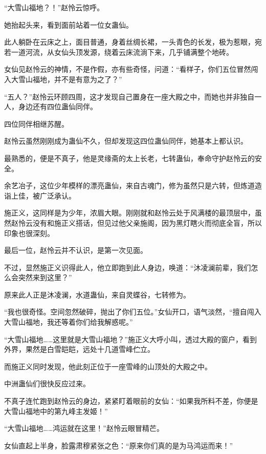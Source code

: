 
\begin{this_body}



“大雪山福地？！”赵怜云惊呼。

她抬起头来，看到面前站着一位女蛊仙。

此人躺卧在云床之上，面目普通，身着丝绸长裙，一头青色的长发，极为惹眼，宛若一道河流，从女仙头顶发源，绕着云床流淌下来，几乎铺满整个地砖。

女仙见赵怜云的神情，不是作假，亦有些奇怪，问道：“看样子，你们五位冒然闯入大雪山福地，并不是有意为之了？”

“五人？”赵怜云环顾四周，这才发现自己置身在一座大殿之中，而她也并非独自一人，身边还有四位蛊仙同伴。

四位同伴相继苏醒。

赵怜云虽然刚刚成为蛊仙不久，但却发现这四位蛊仙同伴，她基本上都认识。

最熟悉的，便是不真子，他是灵缘斋的太上长老，七转蛊仙，奉命守护赵怜云的安全。

余艺冶子，这位少年模样的漂亮蛊仙，来自古魂门，修为虽然只是六转，但炼道造诣上佳，被广泛承认。

施正义，这同样是为少年，浓眉大眼。刚刚就和赵怜云处于风满楼的最顶层中，虽然赵怜云没有和施正义搭话，但见过他父亲施阁，因为黑灯瞎火而彻底全盲，所以印象也很深刻。

最后一位，赵怜云并不认识，是第一次见面。

不过，显然施正义识得此人，他立即跑到此人身边，唤道：“沐凌澜前辈，我们怎么会突然来到这里？”

原来此人正是沐凌澜，水道蛊仙，来自灵蝶谷，七转修为。

“我也很奇怪。空间忽然破碎，抛出了你们五位。”女仙开口，语气淡然，“擅自闯入大雪山福地，我还等着你们给我解惑呢。”

“大雪山福地……这里就是大雪山福地？”施正义大呼小叫，透过大殿的窗户，看到外界，果然是白雪皑皑，远处十几道雪峰伫立。

而施正义同时发现，他此刻正位于一座雪峰的山顶处的大殿之中。

中洲蛊仙们很快反应过来。

不真子连忙跑到赵怜云的身边，紧紧盯着眼前的女仙：“如果我所料不差，你便是大雪山福地中的第九峰主发姬！”

“大雪山福地……鸿运就在这里！”赵怜云眼冒精芒。

女仙直起上半身，脸露肃穆紧张之色：“原来你们真的是为马鸿运而来！”


\end{this_body}
